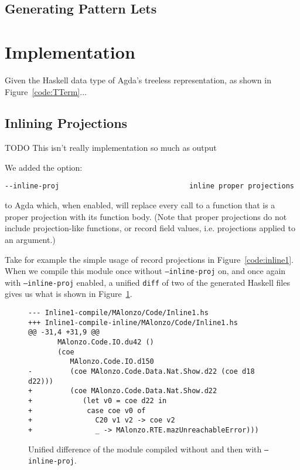\subsection{Generating Pattern Lets}

\section{Implementation}
\label{sec:implementation}

Given the Haskell data type of Agda's treeless representation, as shown in Figure~\ref{code:TTerm}...

\subsection{Inlining Projections}

TODO This isn't really implementation so much as output

We added the option:

\begin{verbatim}
--inline-proj                               inline proper projections
\end{verbatim}

to Agda which, when enabled, will replace every call to a function that is a proper projection with its function body. (Note that proper projections do not include projection-like functions, or record field values, i.e. projections applied to an argument.)



Take for example the simple usage of record projections in Figure~\ref{code:inline1}. When we compile this module once without \texttt{--inline-proj} on, and once again with \texttt{--inline-proj} enabled, a unified \texttt{diff} of two of the generated Haskell files gives us what is shown in Figure~\ref{fig:inline1_diff}.

\begin{figure}
\begin{verbatim}
--- Inline1-compile/MAlonzo/Code/Inline1.hs
+++ Inline1-compile-inline/MAlonzo/Code/Inline1.hs
@@ -31,4 +31,9 @@
       MAlonzo.Code.IO.du42 ()
       (coe
          MAlonzo.Code.IO.d150
-         (coe MAlonzo.Code.Data.Nat.Show.d22 (coe d18 d22)))
+         (coe MAlonzo.Code.Data.Nat.Show.d22
+            (let v0 = coe d22 in
+             case coe v0 of
+               C20 v1 v2 -> coe v2
+               _ -> MAlonzo.RTE.mazUnreachableError)))
\end{verbatim}

\caption{Unified difference of the  module compiled without and then with \texttt{--inline-proj}.}
\label{fig:inline1_diff}
\end{figure}

